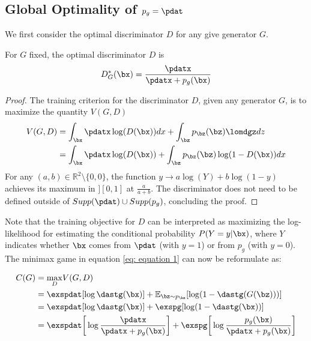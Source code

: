 \subsection{Global Optimality of $p_g = \pdat$}\label{sec: global opt}

We first consider the optimal discriminator $D$ for any give generator $G$.

\begin{proposition}
	For $G$ fixed, the optimal discriminator $D$ is
	\begin{equation}
		D^{\ast}_G(\bx) = \frac{\pdatx}{\pdatx + p_g(\bx)}\label{eq: equation 2}
	\end{equation}
\end{proposition}

\begin{proof}
	The training criterion for the discriminator $D$, given any generator $G$, is to maximize the quantity $V(G, D)$
	\begin{align}
		V(G, D) &= \int_{\bx}{\pdatx}\log(D(\bx))dx + \int_{\bz}{p_{\bz}(\bz)\lomdgz}dz\nonumber\\
		&= \int_{\bx}{\pdatx}\log(D(\bx)) + \int_{\bz}{p_{\bz}(\bz)\log(1 - D(\bx))}dx \label{eq: equation 3}
	\end{align}
	For any $(a, b) \in \mathbb{R}^2 \setminus \{0,0\}$, the function $y\rightarrow a\log(Y)+ b\log(1-y)$ achieves its maximum in $][0,1]$ at $\frac{a}{a+b}$. The discriminator does not need to be defined outside of $Supp(\pdat)\cup Supp(p_g)$, concluding the proof.
\end{proof}

\noindent Note that the training objective for $D$ can be interpreted as maximizing the log-likelihood for estimating the conditional probability $P(Y=y|\bx)$, where $Y$ indicates whether $\bx$ comes from $\pdat$ (with $y=1$) or from $p_g$ (with $y=0$). The minimax game in equation \ref{eq: equation 1} can now be reformulate as:

\begin{align}
	C(G) &= \underset{D}{\max}V(G,D)\nonumber\\
	&= \exspdat[\log \dastg(\bx)] + \mathbb{E}_{\bz\sim p_{\bz}}[\log(1-\dastg(G(\bz)))]\label{eq: equation 4} \\
	&= \exspdat[\log \dastg(\bx)] + \exspg[\log(1-\dastg(\bx))]\nonumber\\
	&= \exspdat\bigg[\log\frac{\pdatx}{\pdatx+p_g(\bx)}\bigg]+\exspg\bigg[\log\frac{p_g(\bx)}{\pdatx+p_g(\bx)}\bigg]\nonumber
\end{align}

